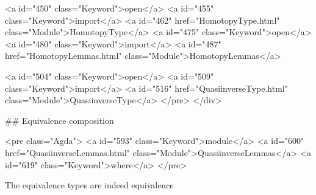 <a id="450" class="Keyword">open</a> <a id="455" class="Keyword">import</a> <a id="462" href="HomotopyType.html" class="Module">HomotopyType</a>
<a id="475" class="Keyword">open</a> <a id="480" class="Keyword">import</a> <a id="487" href="HomotopyLemmas.html" class="Module">HomotopyLemmas</a>


<a id="504" class="Keyword">open</a> <a id="509" class="Keyword">import</a> <a id="516" href="QuasiinverseType.html" class="Module">QuasiinverseType</a>
</pre>
</div>

## Equivalence composition

<pre class="Agda">
<a id="593" class="Keyword">module</a> <a id="600" href="QuasiinverseLemmas.html" class="Module">QuasiinverseLemmas</a> <a id="619" class="Keyword">where</a>
</pre>

The equivalence types are indeed equivalence

